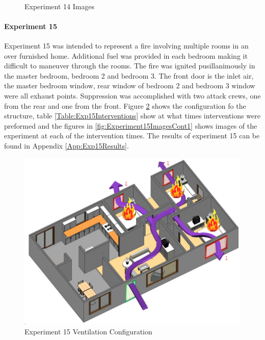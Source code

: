\documentclass{article}
\begin{document}
\begin{figure}[H]
	\ContinuedFloat 
	\centering 
	 \ 
	\caption{Experiment 14 Images}
	\label{fig:Experiment14ImagesCont3} 
\end{figure}

\paragraph{Experiment 15}\mbox{}

Experiment 15 was intended to represent a fire involving multiple rooms in an over furnished home. Additional fuel was provided in each bedroom making it difficult to maneuver through the rooms. The fire was ignited pusillanimously in the master bedroom, bedroom 2 and bedroom 3. The front door is the inlet air, the master bedroom window, rear window of bedroom 2 and bedroom 3 window were all exhaust points. Suppression was accomplished with two attack crews, one from the rear and one from the front. Figure \ref{fig:Exp15VentConfig} shows the configuration fo the structure, table \ref{Table:Exp15Interventions} show at what times interventions were preformed and the figures in \ref{fig:Experiment15ImagesCont1} shows images of the experiment at each of the intervention times. The results of experiment 15 can be found in Appendix \ref{App:Exp15Results}.

\begin{figure}[h!]
	\centering
	\includegraphics[width=5in]{0_Images/FireExperiments/Single_Story/Experiment_15.jpg}
	\caption{Experiment 15 Ventilation Configuration}
	\label{fig:Exp15VentConfig}
\end{figure}
\end{document}
